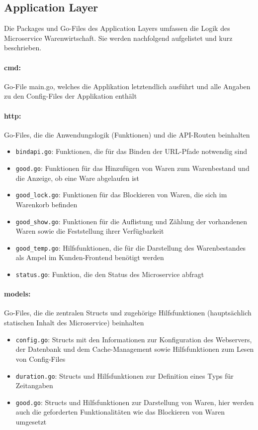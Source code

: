 \newpage
\subsection{Application Layer}
\label{subsec: Application Layer}
Die Packages und Go-Files des Application Layers umfassen die Logik des Microservice Warenwirtschaft. Sie werden nachfolgend aufgelistet und kurz beschrieben.

\paragraph{cmd:} Go-File main.go, welches die Applikation letztendlich ausführt und alle Angaben zu den Config-Files der Applikation enthält

\paragraph{http:} Go-Files, die die Anwendungslogik (Funktionen) und die API-Routen beinhalten
	\begin{itemize}
	\item \texttt{bindapi.go}: Funktionen, die für das Binden der URL-Pfade notwendig sind
	\item \texttt{good.go}: Funktionen für das Hinzufügen von Waren zum Warenbestand und die Anzeige, ob eine Ware abgelaufen ist
	\item \texttt{good\_lock.go}: Funktionen für das Blockieren von Waren, die sich im Warenkorb befinden
		\item \texttt{good\_show.go}: Funktionen für die Auflistung und Zählung der vorhandenen Waren sowie die Feststellung ihrer Verfügbarkeit
	\item \texttt{good\_temp.go}: Hilfsfunktionen, die für die Darstellung des Warenbestandes als Ampel im Kunden-Frontend benötigt werden
	\item \texttt{status.go}: Funktion, die den Status des Microservice abfragt 
	\end{itemize}


\paragraph{models:} Go-Files, die die zentralen Structs und zugehörige Hilfsfunktionen (hauptsächlich statischen Inhalt des Microservice) beinhalten 
	\begin{itemize}
	\item \texttt{config.go}: Structs mit den Informationen zur Konfiguration des Webservers, der Datenbank und dem Cache-Management sowie Hilfsfunktionen zum Lesen von Config-Files
	\item \texttt{duration.go}: Structs und Hilfsfunktionen zur Definition eines Typs für Zeitangaben
	\item \texttt{good.go}: Structs und Hilfsfunktionen zur Darstellung von Waren, hier werden auch die geforderten Funktionalitäten wie das Blockieren von Waren umgesetzt
	\end{itemize}


